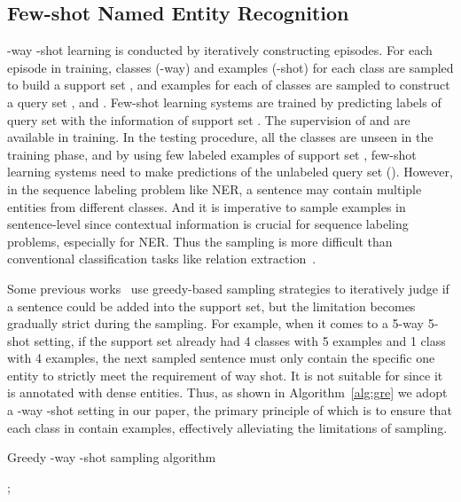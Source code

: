 \documentclass[11pt,a4paper, dvipsnames]{article}
\begin{document}
\subsection{Few-shot Named Entity Recognition}

-way -shot learning is conducted by iteratively constructing episodes. For each episode in training,  classes (-way) and  examples (-shot) for each class are sampled to build a support set ,  and  examples for each of  classes are sampled to construct a query set , and . Few-shot learning systems are trained by predicting labels of query set  with the information of support set . The supervision of  and  are available in training. In the testing procedure, all the classes are unseen in the training phase, and by using few labeled examples of support set , few-shot learning systems need to make predictions of the unlabeled query set  (). However, in the sequence labeling problem like NER, a sentence may contain multiple entities from different classes. And it is imperative to sample examples in sentence-level since contextual information is crucial for sequence labeling problems, especially for NER. Thus the sampling is more difficult than conventional classification tasks like relation extraction~\cite{han2018fewrel}.

Some previous works~\cite{yang2020simple, li2020few} use greedy-based sampling strategies to iteratively judge if a sentence could be added into the support set, but the limitation becomes gradually strict during the sampling. For example, when it comes to a 5-way 5-shot setting, if the support set already had 4 classes with 5 examples and 1 class with 4 examples, the next sampled sentence must only contain the specific one entity to strictly meet the requirement of  way  shot. It is not suitable for  since it is annotated with dense entities. Thus, as shown in Algorithm~\ref{alg:gre} we adopt a -way -shot setting in our paper, the primary principle of which is to ensure that each class in  contain  examples, effectively alleviating the limitations of sampling.


\begin{algorithm}[h]
\caption{Greedy -way -shot sampling algorithm}
\LinesNumbered \label{alg:gre}
;  {} 
{} 
\end{algorithm}
\vspace{-0.2cm}
\end{document}
